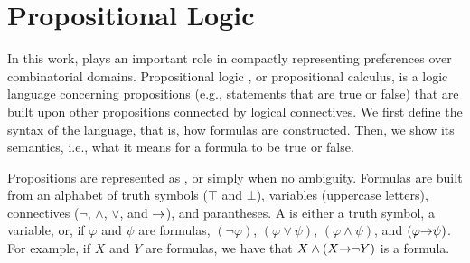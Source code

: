 \section{Propositional Logic}
In this work,  plays an important role in compactly representing
preferences over combinatorial domains.
Propositional logic \cite{heindiscrete}, or propositional calculus, is a logic language concerning
propositions (e.g., statements that are true or false) that are built upon other propositions
connected by logical connectives.
We first define the syntax of the language, that is, how formulas are constructed.
Then, we show its semantics, i.e., what it means for a formula to be true or false.

Propositions are represented as , or simply  when no ambiguity.
Formulas are built from an alphabet of truth symbols ($\top$ and $\bot$),
variables (uppercase letters), connectives ($\neg$, $\land$, $\lor$, and $\mathit{\rightarrow}$), and parantheses.
A  is either a truth symbol, a variable, or, if $\varphi$ and $\psi$ are formulas,
$(\neg \varphi)$, $(\varphi \lor \psi)$, $(\varphi \land \psi)$, and
$(\varphi \mathit{\rightarrow} \psi)$.
For example, if $X$ and $Y$ are formulas, we have that $X \land (X \mathit{\rightarrow} \neg Y)$ is a formula.

%

